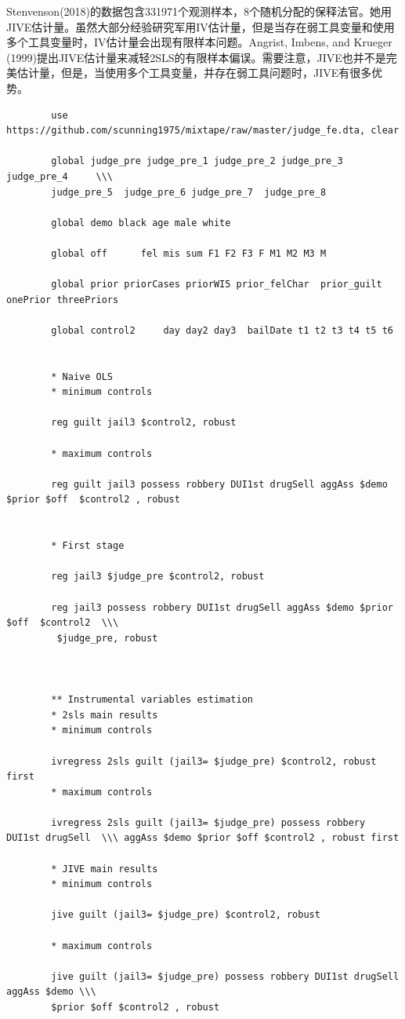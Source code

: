 \documentclass[cn,12pt,math=newtx,citestyle=gb7714-2015,bibstyle=gb7714-2015]{elegantbook}
\begin{document}
	Stenvenson(2018)的数据包含331971个观测样本，8个随机分配的保释法官。她用JIVE估计量。虽然大部分经验研究军用IV估计量，但是当存在弱工具变量和使用多个工具变量时，IV估计量会出现有限样本问题。Angrist, Imbens, and Krueger (1999)提出JIVE估计量来减轻2SLS的有限样本偏误。需要注意，JIVE也并不是完美估计量，但是，当使用多个工具变量，并存在弱工具问题时，JIVE有很多优势。
	
	\begin{lstlisting}
		use https://github.com/scunning1975/mixtape/raw/master/judge_fe.dta, clear
		
		global judge_pre judge_pre_1 judge_pre_2 judge_pre_3 judge_pre_4     \\\    
		judge_pre_5  judge_pre_6 judge_pre_7  judge_pre_8
		
		global demo black age male white 
		
		global off      fel mis sum F1 F2 F3 F M1 M2 M3 M 
		
		global prior priorCases priorWI5 prior_felChar  prior_guilt onePrior threePriors
		
		global control2     day day2 day3  bailDate t1 t2 t3 t4 t5 t6
		
		
		* Naive OLS
		* minimum controls
		
		reg guilt jail3 $control2, robust
		
		* maximum controls
		
		reg guilt jail3 possess robbery DUI1st drugSell aggAss $demo $prior $off  $control2 , robust
		
		
		* First stage
		
		reg jail3 $judge_pre $control2, robust
		
		reg jail3 possess robbery DUI1st drugSell aggAss $demo $prior $off  $control2  \\\
		 $judge_pre, robust
		
		
		
		** Instrumental variables estimation
		* 2sls main results
		* minimum controls
		
		ivregress 2sls guilt (jail3= $judge_pre) $control2, robust first
		* maximum controls
		
		ivregress 2sls guilt (jail3= $judge_pre) possess robbery DUI1st drugSell  \\\ aggAss $demo $prior $off $control2 , robust first
		
		* JIVE main results
		* minimum controls
		
		jive guilt (jail3= $judge_pre) $control2, robust
		
		* maximum controls
		
		jive guilt (jail3= $judge_pre) possess robbery DUI1st drugSell aggAss $demo \\\ 
		$prior $off $control2 , robust
		
	\end{lstlisting}
	
\end{document}
